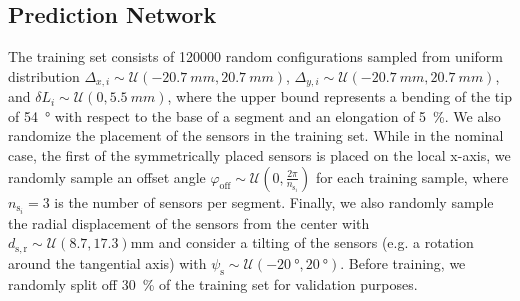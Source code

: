 %

\subsection{Prediction Network}\label{sub:promasens:pcc_simulations:neural_network}
The training set consists of \SI{120000}{} random configurations sampled from uniform distribution $\Delta_{x,i} \sim \mathcal{U}(-\SI{20.7}{mm}, \SI{20.7}{mm})$, $\Delta_{y,i} \sim \mathcal{U}(-\SI{20.7}{mm}, \SI{20.7}{mm})$, and $\delta L_i \sim \mathcal{U}(0, \SI{5.5}{mm})$, where the upper bound represents a bending of the tip of \SI{54}{\degree} with respect to the base of a segment and an elongation of \SI{5}{\percent}. We also randomize the placement of the sensors in the training set. While in the nominal case, the first of the symmetrically placed sensors is placed on the local x-axis, we randomly sample an offset angle $\varphi_\mathrm{off} \sim \mathcal{U}(0, \frac{2\pi}{n_{\mathrm{s}_i}})$ for each training sample, where $n_{\mathrm{s}_i} = 3$ is the number of sensors per segment.
Finally, we also randomly sample the radial displacement of the sensors from the center with $d_{\mathrm{s}, \mathrm{r}} \sim \mathcal{U}(8.7, 17.3) \mathrm{mm}$ and consider a tilting of the sensors (e.g. a rotation around the tangential axis) with $\psi_\mathrm{s} \sim \mathcal{U}(\SI{-20}{\degree}, \SI{20}{\degree})$.
Before training, we randomly split off \SI{30}{\percent} of the training set for validation purposes.

